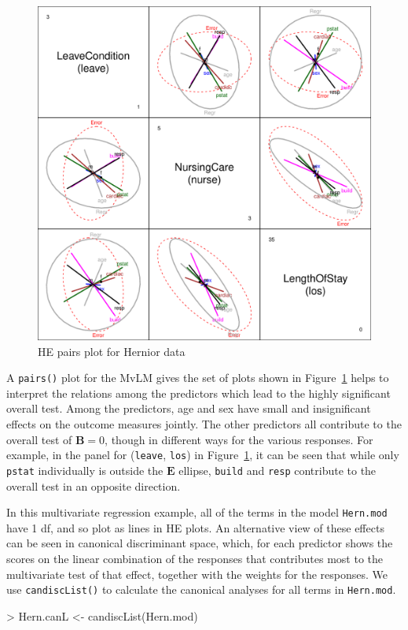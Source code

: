 \documentclass[11pt]{article}
\newcommand{\mat}[1]{\ensuremath{\bm{#1}}}
\newcommand*{\MLM}{MvLM\xspace}
\newcommand{\figref}[1]{Figure~\ref{#1}}
\newcommand{\code}[1]{{\texttt{#1}}}
\newcommand{\func}[1]{{\texttt{#1()}}}
\begin{document}
\begin{figure}[htb]
\begin{center}
	\includegraphics[width=.8\textwidth]{fig/plot-hern-pairs}
\caption{HE pairs plot for Hernior data}
\label{fig:hern-pairs}
\end{center}
\end{figure}

A \func{pairs} plot for the \MLM gives the set of plots shown in \figref{fig:hern-pairs}
helps to interpret the relations among the predictors which lead to the highly significant
overall test.
Among the predictors, age and sex have small and insignificant effects on the outcome measures
jointly.  The other predictors all contribute to the overall test of $\mat{B} = 0$,
though in different ways for the various responses.
For example, in the panel for (\code{leave}, \code{los}) in  \figref{fig:hern-pairs},
it can be seen that while only \code{pstat} individually is outside the 
$\mat{E}$ ellipse, \code{build} and \code{resp} contribute to the overall test in
an opposite direction.
 
In this multivariate regression example, all of the terms in the model \code{Hern.mod}
have 1 df, and so plot as lines in HE plots.  An alternative view of these effects
can be seen in canonical discriminant space, which, for each predictor shows the
scores on the linear combination of the responses that contributes most to 
the multivariate test of that effect, together with the weights for the responses.
We use \func{candiscList} to calculate the canonical analyses for all terms in
\code{Hern.mod}.
\begin{Schunk}
\begin{Sinput}
> Hern.canL <- candiscList(Hern.mod)
\end{Sinput}
\end{Schunk}
\end{document}
